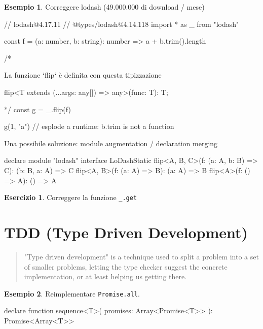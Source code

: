 \documentclass[12pt]{article}
\theoremstyle{definition}
\newtheorem{example}{Esempio}[subsection]
\newtheorem{exercise}{Esercizio}[subsection]
\newenvironment{code}
  {\vspace{0.5cm} \VerbatimEnvironment\begin{typescriptcode}}
  {\end{typescriptcode} \vspace{0.2cm}}
\begin{document}
\begin{example}
Correggere lodash (49.000.000 di download / mese)

\begin{code}
// lodash@4.17.11
// @types/lodash@4.14.118
import * as _ from "lodash"

const f = (a: number, b: string): number =>
  a + b.trim().length

/*

  La funzione `flip` è definita con questa tipizzazione

  flip<T extends (...args: any[]) => any>(func: T): T;

*/
const g = _.flip(f)

g(1, "a") // esplode a runtime: b.trim is not a function
\end{code}

Una possibile soluzione: module augmentation / declaration merging

\begin{code}
declare module "lodash" {
  interface LoDashStatic {
    flip<A, B, C>(f: (a: A, b: B) => C): (b: B, a: A) => C
    flip<A, B>(f: (a: A) => B): (a: A) => B
    flip<A>(f: () => A): () => A
  }
}
\end{code}

\end{example}

\begin{exercise}
Correggere la funzione \texttt{\_.get}
\end{exercise}

\newpage
\section{TDD (Type Driven Development)}

\begin{quote}
"Type driven development" is a technique used to split a problem into a set of smaller problems,
letting the type checker suggest the concrete implementation, or at least helping us getting there.
\end{quote}

\begin{example}
Reimplementare \texttt{Promise.all}.

\begin{code}
declare function sequence<T>(
  promises: Array<Promise<T>>
): Promise<Array<T>>
\end{code}

\end{example}
\end{document}
